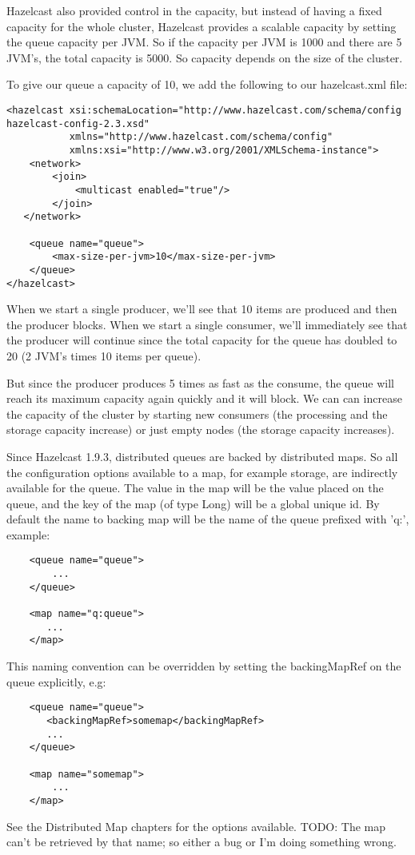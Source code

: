 Hazelcast also provided control in the capacity, but instead of having a fixed capacity for the whole cluster, Hazelcast provides a scalable capacity by setting the queue capacity per JVM. So if the capacity per JVM is 1000 and there are 5 JVM's, the total capacity is 5000. So capacity depends on the size of the cluster.

To give our queue a capacity of 10, we add the following to our hazelcast.xml file:
\begin{verbatim}
<hazelcast xsi:schemaLocation="http://www.hazelcast.com/schema/config hazelcast-config-2.3.xsd"
           xmlns="http://www.hazelcast.com/schema/config"
           xmlns:xsi="http://www.w3.org/2001/XMLSchema-instance">
    <network>
        <join>
            <multicast enabled="true"/>
        </join>
   </network>

    <queue name="queue">
        <max-size-per-jvm>10</max-size-per-jvm>
    </queue>
</hazelcast>
\end{verbatim}

When we start a single producer, we'll see that 10 items are produced and then the producer blocks. When we start a single consumer, we'll immediately see that the producer will continue since the total capacity for the queue has doubled to 20 (2 JVM's times 10 items per queue). 

But since the producer produces 5 times as fast as the consume, the queue will reach its maximum capacity again quickly and it will block. We can can increase the capacity of the cluster by starting new consumers (the processing and the storage capacity increase) or just empty nodes (the storage capacity increases).

Since Hazelcast 1.9.3, distributed queues are backed by distributed maps. So all the configuration options available to a map, for example storage, are indirectly available for the queue. The value in the map will be the value placed on the queue, and the key of the map (of type Long) will be a global unique id. By default the name to backing map will be the name of the queue prefixed with 'q:', example:
\begin{verbatim}
    <queue name="queue">
        ...
    </queue>

    <map name="q:queue">
       ...
    </map>
\end{verbatim}

This naming convention can be overridden by setting the backingMapRef on the queue explicitly, e.g:
\begin{verbatim}
    <queue name="queue">
       <backingMapRef>somemap</backingMapRef>
       ... 
    </queue>

    <map name="somemap">
        ...
    </map>
\end{verbatim}
See the Distributed Map chapters for the options available.
TODO: The map can't be retrieved by that name; so either a bug or I'm doing something wrong.

